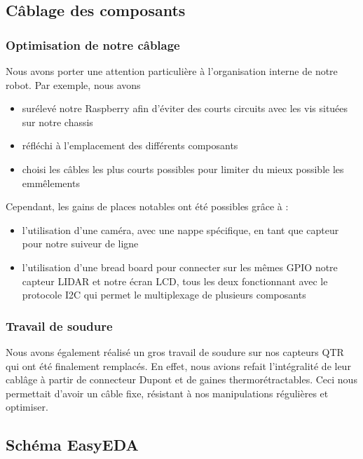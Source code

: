 \subsection{Câblage des composants}

\subsubsection*{Optimisation de notre câblage}
Nous avons porter une attention particulière à l'organisation interne de notre robot. Par exemple, nous avons 
\begin{itemize}
    \item surélevé notre Raspberry afin d'éviter des courts circuits avec les vis situées sur notre chassis
    \item réfléchi à l'emplacement des différents composants
    \item choisi les câbles les plus courts possibles pour limiter du mieux possible les emmêlements
\end{itemize}
Cependant, les gains de places notables ont été possibles grâce à :
\begin{itemize}
    \item l'utilisation d'une caméra, avec une nappe spécifique, en tant que capteur pour notre suiveur de ligne
    \item l'utilisation d'une bread board pour connecter sur les mêmes GPIO notre capteur LIDAR et notre écran LCD, tous les deux fonctionnant avec le protocole I2C qui permet le multiplexage de plusieurs composants
\end{itemize}

\subsubsection*{Travail de soudure}
Nous avons également réalisé un gros travail de soudure sur nos capteurs QTR qui ont été finalement remplacés. En effet, nous avions refait l'intégralité de leur cablâge à partir de connecteur Dupont et de gaines thermorétractables. Ceci nous permettait d'avoir un câble fixe, résistant à nos manipulations régulières et optimiser.
\subsection{Schéma EasyEDA}

\todo